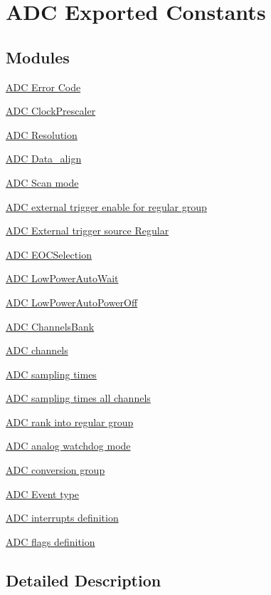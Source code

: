 \hypertarget{group___a_d_c___exported___constants}{\section{A\-D\-C Exported Constants}
\label{group___a_d_c___exported___constants}
}
\subsection*{Modules}
\begin{DoxyCompactItemize}
\item 
\hyperlink{group___a_d_c___error___code}{A\-D\-C Error Code}
\item 
\hyperlink{group___a_d_c___clock_prescaler}{A\-D\-C Clock\-Prescaler}
\item 
\hyperlink{group___a_d_c___resolution}{A\-D\-C Resolution}
\item 
\hyperlink{group___a_d_c___data__align}{A\-D\-C Data\-\_\-align}
\item 
\hyperlink{group___a_d_c___scan__mode}{A\-D\-C Scan mode}
\item 
\hyperlink{group___a_d_c___external__trigger__edge___regular}{A\-D\-C external trigger enable for regular group}
\item 
\hyperlink{group___a_d_c___external__trigger__source___regular}{A\-D\-C External trigger source Regular}
\item 
\hyperlink{group___a_d_c___e_o_c_selection}{A\-D\-C E\-O\-C\-Selection}
\item 
\hyperlink{group___a_d_c___low_power_auto_wait}{A\-D\-C Low\-Power\-Auto\-Wait}
\item 
\hyperlink{group___a_d_c___low_power_auto_power_off}{A\-D\-C Low\-Power\-Auto\-Power\-Off}
\item 
\hyperlink{group___a_d_c___channels_bank}{A\-D\-C Channels\-Bank}
\item 
\hyperlink{group___a_d_c__channels}{A\-D\-C channels}
\item 
\hyperlink{group___a_d_c__sampling__times}{A\-D\-C sampling times}
\item 
\hyperlink{group___a_d_c__sampling__times__all__channels}{A\-D\-C sampling times all channels}
\item 
\hyperlink{group___a_d_c__regular__rank}{A\-D\-C rank into regular group}
\item 
\hyperlink{group___a_d_c__analog__watchdog__mode}{A\-D\-C analog watchdog mode}
\item 
\hyperlink{group___a_d_c__conversion__group}{A\-D\-C conversion group}
\item 
\hyperlink{group___a_d_c___event__type}{A\-D\-C Event type}
\item 
\hyperlink{group___a_d_c__interrupts__definition}{A\-D\-C interrupts definition}
\item 
\hyperlink{group___a_d_c__flags__definition}{A\-D\-C flags definition}
\end{DoxyCompactItemize}


\subsection{Detailed Description}
